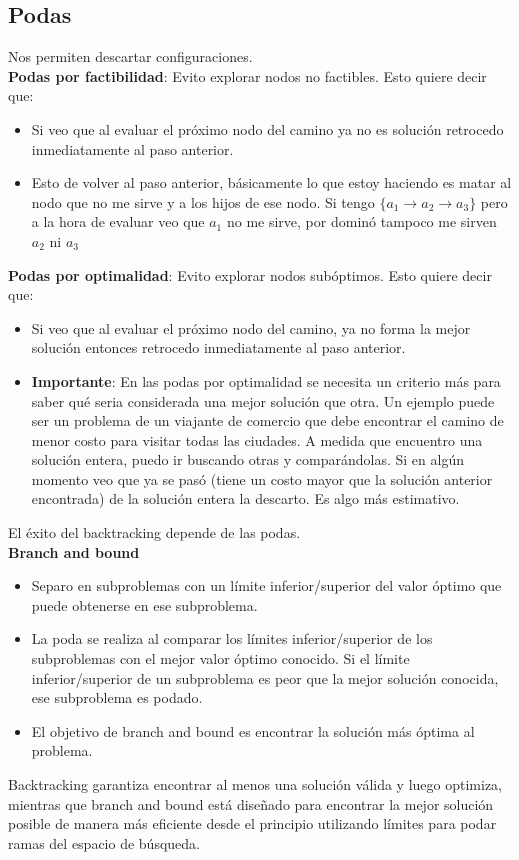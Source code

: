 \documentclass[10pt,a4paper]{article}
\begin{document}
\subsection*{Podas}
Nos permiten descartar configuraciones.\\
\textbf{Podas por factibilidad}: Evito explorar nodos no factibles. Esto quiere decir que:
\begin{itemize}
    \item Si veo que al evaluar el próximo nodo del camino ya no es solución retrocedo inmediatamente al paso anterior.
    \item Esto de volver al paso anterior, básicamente lo que estoy haciendo es matar al nodo que no me sirve y a los hijos de ese nodo. Si tengo $\{ a_{1} \rightarrow a_{2} \rightarrow a_{3}\}$ pero a la hora de evaluar veo que $a_{1}$ no me sirve, por dominó tampoco me sirven $a_{2}$ ni $a_{3}$
\end{itemize}
\textbf{Podas por optimalidad}: Evito explorar nodos subóptimos. Esto quiere decir que: 
\begin{itemize}
    \item Si veo que al evaluar el próximo nodo del camino, ya no forma la mejor solución entonces retrocedo inmediatamente al paso anterior.
    \item \textbf{Importante}: En las podas por optimalidad se necesita un criterio más para saber qué seria considerada una mejor solución que otra. Un ejemplo puede ser un problema de un viajante de comercio que debe encontrar el camino de menor costo para visitar todas las ciudades. A medida que encuentro una solución entera, puedo ir buscando otras y comparándolas. Si en algún momento veo que ya se pasó (tiene un costo mayor que la solución anterior encontrada) de la solución entera la descarto. Es algo más estimativo.
\end{itemize}

El éxito del backtracking depende de las podas. \\
\textbf{Branch and bound} 
\begin{itemize}
    \item Separo en subproblemas con un límite inferior/superior del valor óptimo que puede obtenerse en ese subproblema.
    \item La poda se realiza al comparar los límites inferior/superior de los subproblemas con el mejor valor óptimo conocido. Si el límite inferior/superior de un subproblema es peor que la mejor solución conocida, ese subproblema es podado.
    \item El objetivo de branch and bound es encontrar la solución más óptima al problema.
\end{itemize}
Backtracking garantiza encontrar al menos una solución válida y luego optimiza, mientras que branch and bound está diseñado para encontrar la mejor solución posible de manera más eficiente desde el principio utilizando límites para podar ramas del espacio de búsqueda.
\end{document}
